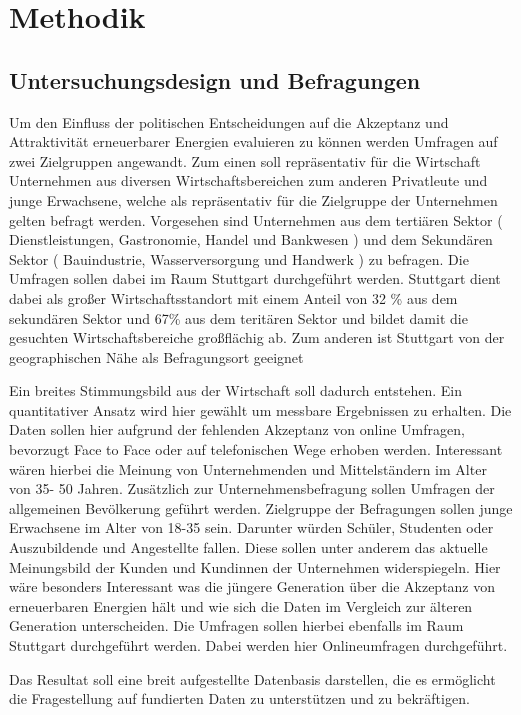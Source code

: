 \documentclass[12pt,a4paper]{article}
\begin{document}
\section*{Methodik}
\subsection*{Untersuchungsdesign und Befragungen }
Um den Einfluss der politischen Entscheidungen auf die Akzeptanz und Attraktivität 
erneuerbarer Energien evaluieren zu können werden Umfragen auf zwei Zielgruppen angewandt. 
Zum einen soll repräsentativ für die Wirtschaft Unternehmen aus diversen Wirtschaftsbereichen 
zum anderen Privatleute und junge Erwachsene, welche als repräsentativ für die Zielgruppe der Unternehmen 
gelten befragt werden. Vorgesehen sind Unternehmen aus dem tertiären Sektor 
( Dienstleistungen, Gastronomie, Handel und Bankwesen ) und dem Sekundären Sektor
( Bauindustrie, Wasserversorgung und Handwerk )  zu befragen. 
Die Umfragen sollen dabei im Raum Stuttgart durchgeführt werden. Stuttgart dient dabei als großer 
Wirtschaftsstandort mit einem Anteil von 32 \% aus dem sekundären Sektor und 67\% aus 
dem teritären Sektor \autocite{stuttgart:2023} und bildet damit die gesuchten Wirtschaftsbereiche großflächig ab. 
Zum anderen ist Stuttgart von der geographischen Nähe als Befragungsort geeignet 

Ein breites Stimmungsbild aus der Wirtschaft soll dadurch entstehen. Ein quantitativer Ansatz 
wird hier gewählt um messbare Ergebnissen zu erhalten. Die Daten sollen hier aufgrund der fehlenden 
Akzeptanz von online Umfragen, bevorzugt Face to Face oder auf telefonischen Wege erhoben werden. 
Interessant wären hierbei die Meinung von Unternehmenden und Mittelständern im Alter von 35- 50 Jahren. 
Zusätzlich zur Unternehmensbefragung sollen Umfragen der allgemeinen Bevölkerung geführt werden. 
Zielgruppe der Befragungen sollen junge Erwachsene im Alter von 18-35 sein. Darunter würden Schüler, 
Studenten oder Auszubildende und Angestellte fallen. Diese sollen unter anderem das aktuelle Meinungsbild 
der Kunden und Kundinnen der Unternehmen widerspiegeln. Hier wäre besonders Interessant was die jüngere Generation 
über die Akzeptanz von erneuerbaren Energien hält und wie sich die Daten im Vergleich zur älteren Generation unterscheiden. 
Die Umfragen sollen hierbei ebenfalls im Raum Stuttgart durchgeführt werden. Dabei werden hier Onlineumfragen durchgeführt. 

Das Resultat soll eine breit aufgestellte Datenbasis darstellen, die es ermöglicht die Fragestellung auf fundierten Daten zu unterstützen und zu bekräftigen.  
\end{document}
